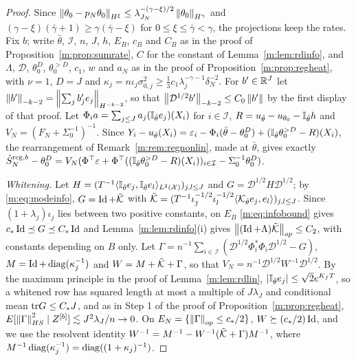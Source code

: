 \begin{proof}
Since $\left\|\theta_0-p_N\theta_0\right\|_{H^\xi}\le\lambda_{J_N}^{-(\gamma-\xi)/2}\left\|\theta_0\right\|_{H^\gamma}$ and $(\gamma-\xi)(\bar\gamma+1)\ge\gamma(\bar\gamma-\xi)$ for $0\le\xi\le\bar\gamma<\gamma$, the projections keep the rates. Fix $b$; write $\bar\theta$, $\mathcal I$, $n$, $J$, $h$, $E_B$, $c_B$ and $C_B$ as in the proof of Proposition~\ref{m:prop:sumrate}, $C$ for the constant of Lemma~\ref{m:lem:rdinfo}, and $\Lambda$, $\mathcal D$, $\theta_0^D$, $\theta_0^{>D}$, $c_1$, $w$ and $a_N$ as in the proof of Proposition~\ref{m:prop:regheat}, with $\nu=1$, $D=J$ and $\kappa_j=n\iota_j\sigma^2_{0,j}\ge\frac13c_1\lambda_j^{-\gamma-1}\delta_N^{-2}$. For $b'\in\mathbb{R}^J$ let $\left\|b'\right\|_{-k-2}=\left\|\sum_jb'_je_j\right\|_{H^{-k-2}}$, so that $\left\|\mathcal D^{1/2}b'\right\|_{-k-2}\le C_0\left\|b'\right\|$ by the first display of that proof. Let $\Phi_ia=\sum_{j\le J}a_j(\mathbb{I}_{\bar\theta}e_j)(X_i)$ for $i\in\mathcal I$, $R=u_{\bar\theta}-u_{\theta_0}-\mathbb{I}_{\bar\theta}h$ and $V_N=(F_N+\Sigma_0^{-1})^{-1}$. Since $Y_i-u_{\bar\theta}(X_i)=\varepsilon_i-\Phi_i(\bar\theta-\theta_0^D)+(\mathbb{I}_{\bar\theta}\theta_0^{>D}-R)(X_i)$, the rearrangement of Remark~\ref{m:rem:regnonlin}, made at $\bar\theta$, gives exactly $\hat S^{{\rm reg},b}_N-\theta_0^D=V_N(\Phi^\top\varepsilon+\Phi^\top((\mathbb{I}_{\bar\theta}\theta_0^{>D}-R)(X_i))_{i\in\mathcal I}-\Sigma_0^{-1}\theta_0^D)$.

\emph{Whitening.} Let $H=(T^{-1}\langle\mathbb{I}_{\bar\theta}e_j,\mathbb{I}_{\bar\theta}e_l\rangle_{L^2(\mathcal X)})_{j,l\le J}$ and $G=\mathcal D^{1/2}H\mathcal D^{1/2}$; by \eqref{m:eq:modeinfo}, $G=\operatorname{Id}+\tilde{\mathcal{K}}$ with $\tilde{\mathcal{K}}=(T^{-1}\iota_j^{-1/2}\iota_l^{-1/2}\langle\mathcal{K}_{\bar\theta}e_j,e_l\rangle)_{j,l\le J}$. Since $(1+\lambda_j)\iota_j$ lies between two positive constants, on $E_B$ \eqref{m:eq:infobound} gives $c_*\operatorname{Id}\preceq G\preceq C_*\operatorname{Id}$ and Lemma~\ref{m:lem:rdinfo}(i) gives $\left\|(\operatorname{Id}+\Lambda)\tilde{\mathcal{K}}\right\|_{op}\le C_2$, with constants depending on $B$ only. Let $\Gamma=n^{-1}\sum_{i\in\mathcal I}(\mathcal D^{1/2}\Phi_i^*\Phi_i\mathcal D^{1/2}-G)$, $M=\operatorname{Id}+\operatorname{diag}(\kappa_j^{-1})$ and $W=M+\tilde{\mathcal{K}}+\Gamma$, so that $V_N=n^{-1}\mathcal D^{1/2}W^{-1}\mathcal D^{1/2}$. By the maximum principle in the proof of Lemma~\ref{m:lem:rdlin}, $|\mathbb{I}_{\bar\theta}e_j|\le\sqrt2e^{K_fT}$, so a whitened row has squared length at most a multiple of $J\lambda_J$ and conditional mean $\mathrm{tr} G\le C_*J$, and as in Step 1 of the proof of Proposition~\ref{m:prop:regheat}, $E[\left\|\Gamma\right\|^2_{HS}\mid Z^{[b]}]\lesssim J^2\lambda_J/n\to0$. On $E_N=\{\left\|\Gamma\right\|_{op}\le c_*/2\}$, $W\succeq(c_*/2)\operatorname{Id}$, and we use the resolvent identity $W^{-1}=M^{-1}-W^{-1}(\tilde{\mathcal{K}}+\Gamma)M^{-1}$, where $M^{-1}\operatorname{diag}(\kappa_j^{-1})=\operatorname{diag}((1+\kappa_j)^{-1})$.


\end{proof}
